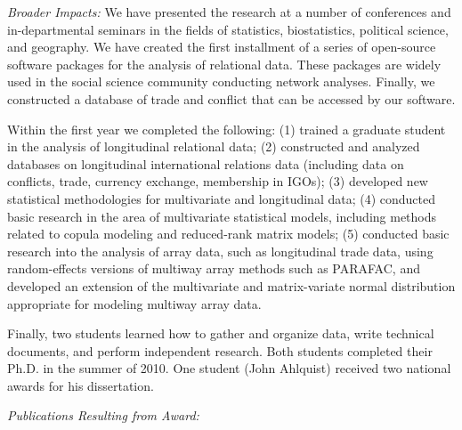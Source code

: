 \documentclass[pdftex,12pt,fullpage,oneside]{amsart}
\begin{document}
\textit{Broader Impacts:} We have presented the research at a number
of conferences and in-departmental seminars in the fields of
statistics, biostatistics, political science, and geography. We have
created the first installment of a series of open-source software
packages for the analysis of relational data. These packages are
widely used in the social science community conducting network
analyses. Finally, we constructed a database of trade and conflict
that can be accessed by our software.

Within the first year we completed the following: (1) trained a
graduate student in the analysis of longitudinal relational data; (2)
constructed and analyzed databases on longitudinal international
relations data (including data on conflicts, trade, currency exchange,
membership in IGOs); (3) developed new statistical methodologies for
multivariate and longitudinal data; (4) conducted basic research in
the area of multivariate statistical models, including methods related
to copula modeling and reduced-rank matrix models; (5) conducted basic
research into the analysis of array data, such as longitudinal trade
data, using random-effects versions of multiway array methods such as
PARAFAC, and developed an extension of the multivariate and
matrix-variate normal distribution appropriate for modeling multiway
array data.

Finally, two students learned how to gather and organize data, write
technical documents, and perform independent research. Both students
completed their Ph.D. in the summer of 2010. One student (John
Ahlquist) received two national awards for his dissertation.

\textit{Publications Resulting from Award:}
\end{document}
